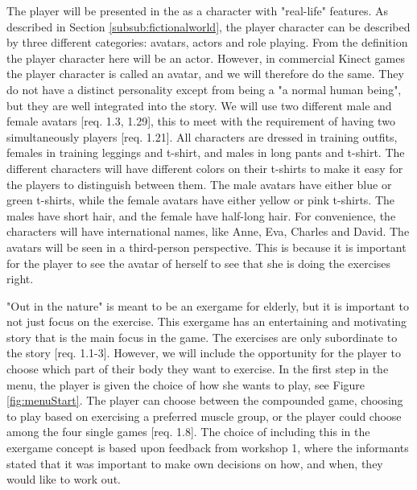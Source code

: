 The player will be presented in the as a character with "real-life" features. As described in Section \ref{subsub:fictionalworld}, the player character can be described by three different categories: avatars, actors and role playing. From the definition the player character here will be an actor. However, in commercial Kinect games the player character is called an avatar, and we will therefore do the same. They do not have a distinct personality except from being a "a normal human being", but they are well integrated into the story. We will use two different male and female avatars [req. 1.3, 1.29], this to meet with the requirement of having two simultaneously players [req. 1.21]. All characters are dressed in training outfits, females in training leggings and t-shirt, and males in long pants and t-shirt. The different characters will have different colors on their t-shirts to make it easy for the players to distinguish between them. The male avatars have either blue or green t-shirts, while the female avatars have either yellow or pink t-shirts. The males have short hair, and the female have half-long hair. For convenience, the characters will have international names, like Anne, Eva, Charles and David. The avatars will be seen in a third-person perspective. This is because it is important for the player to see the avatar of herself to see that she is doing the exercises right. 

"Out in the nature" is meant to be an exergame for elderly, but it is important to not just focus on the exercise. This exergame has an entertaining and motivating story that is the main focus in the game. The exercises are only subordinate to the story [req. 1.1-3]. However, we will include the opportunity for the player to choose which part of their body they want to exercise. In the first step in the menu, the player is given the choice of how she wants to play, see Figure \ref{fig:menuStart}. The player can choose between the compounded game, choosing to play based on exercising a preferred muscle group, or the player could choose among the four single games [req. 1.8]. The choice of including this in the exergame concept is based upon feedback from workshop 1, where the informants stated that it was important to make own decisions on how, and when, they would like to work out.                     

